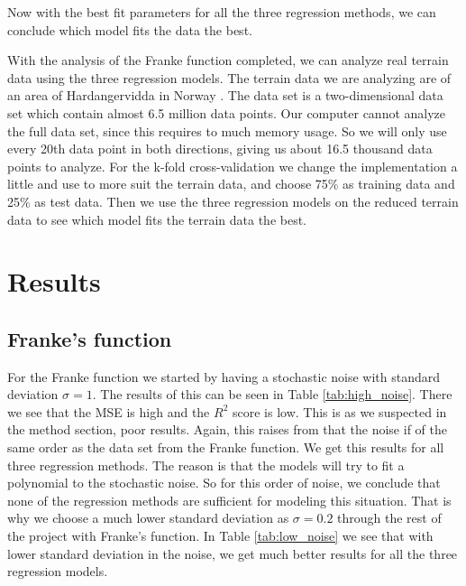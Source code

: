 \documentclass[12pt,a4paper,english]{article}
\begin{document}
Now with the best fit parameters for all the three regression methods, we can conclude which model fits the data the best.

With the analysis of the Franke function completed, we can analyze real terrain data using the three regression models. The terrain data we are analyzing are of an area of Hardangervidda in Norway \cite{earthexplorer}. The data set is a two-dimensional data set which contain almost 6.5 million data points. Our computer cannot analyze the full data set, since this requires to much memory usage. So we will only use every 20th data point in both directions, giving us about 16.5 thousand data points to analyze. For the k-fold cross-validation we change the implementation a little and use to more suit the terrain data, and choose 75\% as training data and 25\% as test data. Then we use the three regression models on the reduced terrain data to see which model fits the terrain data the best.

\section{Results}
\subsection{Franke's function}
For the Franke function we started by having a stochastic noise with standard deviation $\sigma=1$. The results of this can be seen in Table \ref{tab:high_noise}. There we see that the MSE is high and the $R^2$ score is low. This is as we suspected in the method section, poor results. Again, this raises from that the noise if of the same order as the data set from the Franke function. We get this results for all three regression methods. The reason is that the models will try to fit a polynomial to the stochastic noise. So for this order of noise, we conclude that none of the regression methods are sufficient for modeling this situation. That is why we choose a much lower standard deviation as $\sigma=0.2$ through the rest of the project with Franke's function. In Table \ref{tab:low_noise} we see that with lower standard deviation in the noise, we get much better results for all the three regression models.
\end{document}
